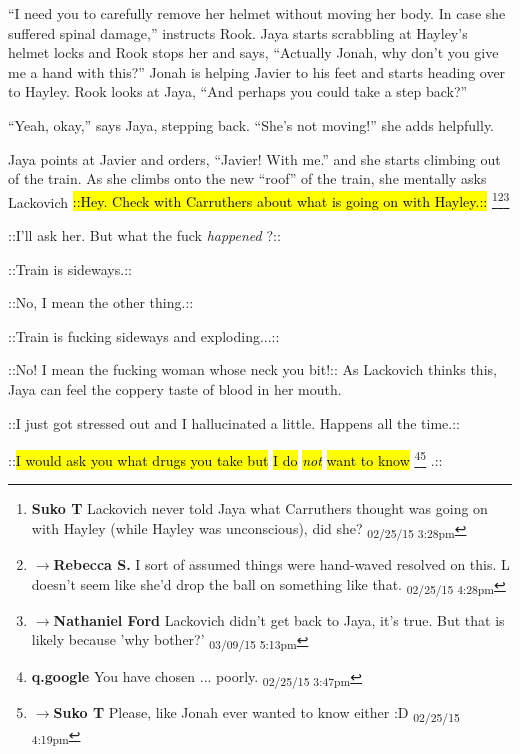 ``I need you to carefully remove her helmet without moving her body.  In case she suffered spinal damage,'' instructs Rook.  Jaya starts scrabbling at Hayley's helmet locks and Rook stops her and says, ``Actually Jonah, why don't you give me a hand with this?''  Jonah is helping Javier to his feet and starts heading over to Hayley.  Rook looks at Jaya, ``And perhaps you could take a step back?''

``Yeah, okay,'' says Jaya, stepping back.  ``She's not moving!'' she adds helpfully.

Jaya points at Javier and orders, ``Javier!  With me.'' and she starts climbing out of the train.  As she climbs onto the new ``roof'' of the train, she mentally asks Lackovich  {\color[RGB]{255,0,0}\hl{::Hey.  Check with Carruthers about what is going on with Hayley.::}} \footnote{\textbf{Suko T }Lackovich never told Jaya what Carruthers thought was going on with Hayley (while Hayley was unconscious), did she? \textsubscript{02/25/15 3:28pm}}\footnote{$\rightarrow$\textbf{Rebecca S. }I sort of assumed things were hand-waved resolved on this.  L doesn't seem like she'd drop the ball on something like that. \textsubscript{02/25/15 4:28pm}}\footnote{$\rightarrow$\textbf{Nathaniel Ford }Lackovich didn't get back to Jaya, it's true. But that is likely because 'why bother?' \textsubscript{03/09/15 5:13pm}}

 {\color[RGB]{74,134,232}::I'll ask her.  But what the fuck } \textit{ {\color[RGB]{74,134,232}happened} } {\color[RGB]{74,134,232}?::} 

 {\color[RGB]{255,0,0}::Train is sideways.::} 

 {\color[RGB]{74,134,232}::No, I mean the other thing.::} 

 {\color[RGB]{255,0,0}::Train is fucking sideways and exploding...::} 

 {\color[RGB]{74,134,232}::No!  I mean the fucking woman whose neck you bit!:: }  As Lackovich thinks this, Jaya can feel the coppery taste of blood in her mouth.

 {\color[RGB]{255,0,0}::I just got stressed out and I hallucinated a little.  Happens all the time.::} 

 {\color[RGB]{74,134,232}::\hl{I would ask you what drugs you take but }}{\color[RGB]{74,134,232}\hl{I do }}\textit{{\color[RGB]{74,134,232}\hl{not}}}{\color[RGB]{74,134,232}\hl{ want to know}} \footnote{\textbf{q.google }You have chosen ... poorly. \textsubscript{02/25/15 3:47pm}}\footnote{$\rightarrow$\textbf{Suko T }Please, like Jonah ever wanted to know either :D \textsubscript{02/25/15 4:19pm}} {\color[RGB]{74,134,232}.::} 

